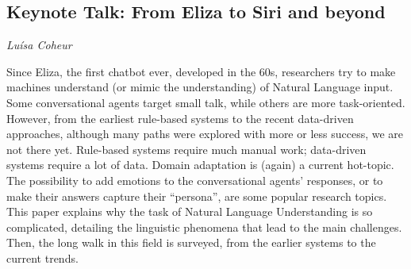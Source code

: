 \documentclass[../booklet.tex]{subfiles}
\begin{document}
\subsection[Keynote Talk: From Eliza to Siri and beyond. {\it Luísa Coheur}]{Keynote Talk: From Eliza to Siri and beyond}

\begin{center}
  {\it Luísa Coheur}
\end{center}

\vskip 0.8cm

Since Eliza, the first chatbot ever, developed in the 60s, researchers
try to make machines understand (or mimic the understanding) of
Natural Language input. Some conversational agents target small talk,
while others are more task-oriented. However, from the earliest
rule-based systems to the recent data-driven approaches, although many
paths were explored with more or less success, we are not there
yet. Rule-based systems require much manual work; data-driven systems
require a lot of data. Domain adaptation is (again) a current
hot-topic. The possibility to add emotions to the conversational
agents' responses, or to make their answers capture their ``persona'',
are some popular research topics.  This paper explains why the task of
Natural Language Understanding is so complicated, detailing the
linguistic phenomena that lead to the main challenges. Then, the long
walk in this field is surveyed, from the earlier systems to the
current trends.
\end{document}
